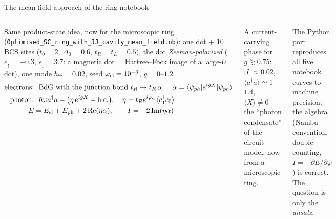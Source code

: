 \documentclass[aspectratio=169,9pt]{beamer}
\begin{document}
\begin{frame}{The mean-field approach of the ring notebook}
  \begin{columns}[T]
    \small Same product-state idea, now for the microscopic ring (\texttt{Optimised\_SC\_ring\_with\_JJ\_cavity\_mean\_field.nb}):
    one dot + $10$ BCS sites ($t_0=2$, $\Delta_0=0.6$, $t_R=t_L=0.5$), the dot \emph{Zeeman-polarized}
    ($\epsilon_\uparrow=-0.3$, $\epsilon_\downarrow=3.7$: a magnetic dot = Hartree--Fock image of a large-$U$ dot),
    one mode $\hbar\omega=0.02$, seed $\varphi_{\rm cl}=10^{-3}$, $g=0$--$1.2$.
    \begin{align*}
      \text{electrons:}&\ \ \text{BdG with the junction bond } t_R\to t_R\,\alpha,\quad \alpha=\langle\psi_{ph}|e^{igX}|\psi_{ph}\rangle\\
      \text{photon:}&\ \ \hbar\omega a^\dagger a-\big(\eta\,e^{igX}+\text{h.c.}\big),\quad
      \eta=t_Re^{i\varphi_{\rm cl}}\langle c^\dagger_1c_0\rangle\\
      E&=E_{\rm el}+E_{\rm ph}+2\,\mathrm{Re}(\eta\alpha),\qquad I=-2\,\mathrm{Im}(\eta\alpha)
    \end{align*}
    \begin{keybox}[title={What it predicts}]
      \small A current-carrying phase for $g\gtrsim0.75$: $|I|\approx0.02$, $\langle a^\dagger a\rangle\simeq1$--$1.4$,
      $\langle X\rangle\neq0$ -- the ``photon condensate'' of the circuit model, now from a microscopic ring.
    \end{keybox}
    \begin{keybox}[title={Checks}]
      \small The Python port reproduces all five notebook curves to machine precision; the algebra (Nambu convention,
      double counting, $I=-\partial E/\partial\varphi$) is correct. The question is only the \emph{ansatz}.
    \end{keybox}
  \end{columns}
\end{frame}
\end{document}
